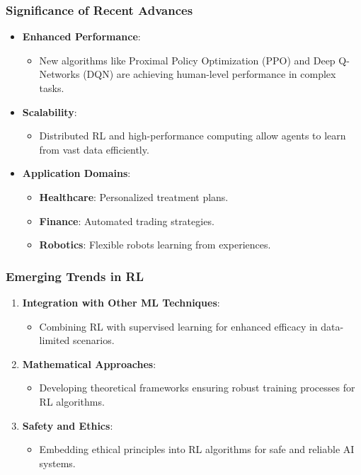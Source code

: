 \documentclass[aspectratio=169]{beamer}
\begin{document}
\begin{frame}[fragile]
    \frametitle{Significance of Recent Advances}
    \begin{itemize}
        \item \textbf{Enhanced Performance}:
            \begin{itemize}
                \item New algorithms like Proximal Policy Optimization (PPO) and Deep Q-Networks (DQN) are achieving human-level performance in complex tasks.
            \end{itemize}
        \item \textbf{Scalability}:
            \begin{itemize}
                \item Distributed RL and high-performance computing allow agents to learn from vast data efficiently.
            \end{itemize}
        \item \textbf{Application Domains}:
            \begin{itemize}
                \item \textbf{Healthcare}: Personalized treatment plans.
                \item \textbf{Finance}: Automated trading strategies.
                \item \textbf{Robotics}: Flexible robots learning from experiences.
            \end{itemize}
    \end{itemize}
\end{frame}

\begin{frame}[fragile]
    \frametitle{Emerging Trends in RL}
    \begin{enumerate}
        \item \textbf{Integration with Other ML Techniques}:
            \begin{itemize}
                \item Combining RL with supervised learning for enhanced efficacy in data-limited scenarios.
            \end{itemize}
        \item \textbf{Mathematical Approaches}:
            \begin{itemize}
                \item Developing theoretical frameworks ensuring robust training processes for RL algorithms.
            \end{itemize}
        \item \textbf{Safety and Ethics}:
            \begin{itemize}
                \item Embedding ethical principles into RL algorithms for safe and reliable AI systems.
            \end{itemize}
    \end{enumerate}
\end{frame}
\end{document}
